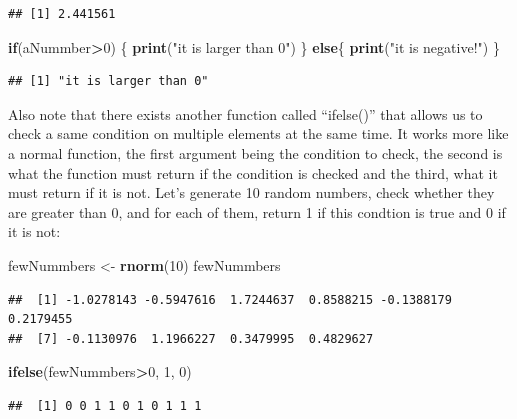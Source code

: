 \documentclass[]{book}
\newenvironment{Shaded}{\begin{snugshade}}{\end{snugshade}}
\newcommand{\ControlFlowTok}[1]{\textcolor[rgb]{0.13,0.29,0.53}{\textbf{#1}}}
\newcommand{\DecValTok}[1]{\textcolor[rgb]{0.00,0.00,0.81}{#1}}
\newcommand{\KeywordTok}[1]{\textcolor[rgb]{0.13,0.29,0.53}{\textbf{#1}}}
\newcommand{\NormalTok}[1]{#1}
\newcommand{\OperatorTok}[1]{\textcolor[rgb]{0.81,0.36,0.00}{\textbf{#1}}}
\newcommand{\StringTok}[1]{\textcolor[rgb]{0.31,0.60,0.02}{#1}}
\begin{document}
\begin{verbatim}
## [1] 2.441561
\end{verbatim}

\begin{Shaded}
\begin{Highlighting}[]
\ControlFlowTok{if}\NormalTok{(aNummber}\OperatorTok{>}\DecValTok{0}\NormalTok{) \{}
  \KeywordTok{print}\NormalTok{(}\StringTok{"it is larger than 0"}\NormalTok{)}
\NormalTok{\} }\ControlFlowTok{else}\NormalTok{\{}
  \KeywordTok{print}\NormalTok{(}\StringTok{"it is negative!"}\NormalTok{)}
\NormalTok{\}}
\end{Highlighting}
\end{Shaded}

\begin{verbatim}
## [1] "it is larger than 0"
\end{verbatim}

Also note that there exists another function called ``ifelse()'' that allows us to check a same condition on multiple elements at the same time. It works more like a normal function, the first argument being the condition to check, the second is what the function must return if the condition is checked and the third, what it must return if it is not. Let's generate 10 random numbers, check whether they are greater than 0, and for each of them, return 1 if this condtion is true and 0 if it is not:

\begin{Shaded}
\begin{Highlighting}[]
\NormalTok{fewNummbers <-}\StringTok{ }\KeywordTok{rnorm}\NormalTok{(}\DecValTok{10}\NormalTok{)}
\NormalTok{fewNummbers}
\end{Highlighting}
\end{Shaded}

\begin{verbatim}
##  [1] -1.0278143 -0.5947616  1.7244637  0.8588215 -0.1388179  0.2179455
##  [7] -0.1130976  1.1966227  0.3479995  0.4829627
\end{verbatim}

\begin{Shaded}
\begin{Highlighting}[]
\KeywordTok{ifelse}\NormalTok{(fewNummbers}\OperatorTok{>}\DecValTok{0}\NormalTok{, }\DecValTok{1}\NormalTok{, }\DecValTok{0}\NormalTok{)}
\end{Highlighting}
\end{Shaded}

\begin{verbatim}
##  [1] 0 0 1 1 0 1 0 1 1 1
\end{verbatim}
\end{document}
